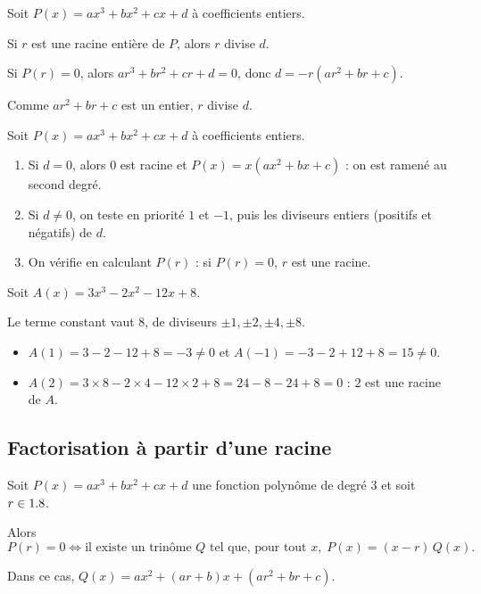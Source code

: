 \begin{prop}
	Soit $P(x) = ax^3 + bx^2 + cx + d$ à coefficients entiers.

	Si $r$ est une racine entière de $P$, alors $r$ divise $d$.
\end{prop}

\begin{demo}
	Si $P(r) = 0$, alors $ar^3 + br^2 + cr + d = 0$, donc $d = -r(ar^2 + br + c)$.

	Comme $ar^2 + br + c$ est un entier, $r$ divise $d$.
\end{demo}

\begin{methode}
	Soit $P(x) = ax^3 + bx^2 + cx + d$ à coefficients entiers.
	\begin{enumerate}
		\item Si $d = 0$, alors $0$ est racine et $P(x) = x(ax^2 + bx + c)$ : on est ramené au second degré.
		\item Si $d \neq 0$, on teste en priorité $1$ et $-1$, puis les diviseurs entiers (positifs et négatifs) de $d$.
		\item On vérifie en calculant $P(r)$ : si $P(r) = 0$, $r$ est une racine.
	\end{enumerate}
\end{methode}

\begin{ex}
	Soit $A(x) = 3x^3 - 2x^2 - 12x + 8$.

	Le terme constant vaut $8$, de diviseurs $\pm 1, \pm 2, \pm 4, \pm 8$.
	\begin{itemize}
		\item $A(1) = 3 - 2 - 12 + 8 = -3 \neq 0$ et $A(-1) = -3 - 2 + 12 + 8 = 15 \neq 0$.
		\item $A(2) = 3 \times 8 - 2 \times 4 - 12 \times 2 + 8 = 24 - 8 - 24 + 8 = 0$ : $2$ est une racine de $A$.
	\end{itemize}
\end{ex}

\subsection{Factorisation à partir d'une racine}

\begin{thm}
	Soit $P(x) = ax^3 + bx^2 + cx + d$ une fonction polynôme de degré $3$ et soit $r \in 1.8$.

	Alors
	\[
		P(r) = 0 \iff \text{il existe un trinôme } Q \text{ tel que, pour tout } x,\; P(x) = (x - r)\,Q(x).
	\]

	Dans ce cas, $Q(x) = ax^2 + (ar + b)x + (ar^2 + br + c)$.
\end{thm}

